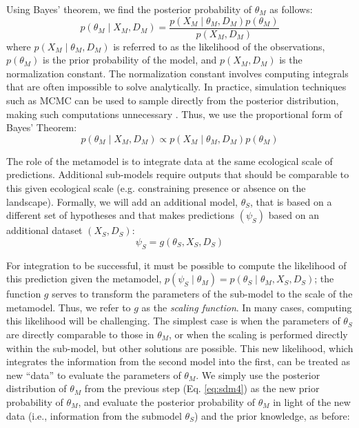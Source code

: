 \documentclass[11pt]{article}
\begin{document}
Using Bayes' theorem, we find the posterior probability of \(\theta_M\) as follows:
\begin{equation}
\label{eq:sdm3}
	p( \theta_M \mid X_M, D_M ) = \frac{ p( X_M \mid \theta_M, D_M ) p( \theta_M ) } { p(X_M, D_M) }
\end{equation}
where \(p( X_M \mid \theta_M, D_M )\) is referred to as the likelihood of the observations, \(p(\theta_M )\) is the prior probability of the model, and \(p(X_M, D_M)\) is the normalization constant.
The normalization constant involves computing integrals that are often impossible to solve analytically. 
In practice, simulation techniques such as MCMC can be used to sample directly from the posterior distribution, making such computations unnecessary \citep{Link2006}.
Thus, we use the proportional form of Bayes' Theorem:
\begin{equation}
\label{eq:sdm4}
	p( \theta_M \mid X_M, D_M ) \propto p( X_M \mid \theta_M, D_M ) p( \theta_M ) 
\end{equation}

The role of the metamodel is to integrate data at the same ecological scale of predictions.
Additional sub-models require outputs that should be comparable to this given ecological scale (e.g. constraining presence or absence on the landscape).
Formally, we will add an additional model, \(\theta_S\), that is based on a different set of hypotheses and that makes predictions \((\psi_S)\) based on an additional dataset \((X_S, D_S)\):
\begin{equation}
\label{eq:model2-1}
	\psi_S = g(\theta_S, X_S, D_S)
\end{equation}

For integration to be successful, it must be possible to compute the likelihood of this prediction given the metamodel, \(p \left( \psi_S \mid \theta_M \right) = p \left(\theta_S \mid \theta_M, X_S, D_S \right)\); the function \(g\) serves to transform the parameters of the sub-model to the scale of the metamodel. Thus, we refer to \(g\) as the \emph{scaling function}. 
In many cases, computing this likelihood will be challenging.
The simplest case is when the parameters of \(\theta_S\) are directly comparable to those in \(\theta_M\), or when the scaling is performed directly within the sub-model, but other solutions are possible.
This new likelihood, which integrates the information from the second model into the first, can be treated as new ``data'' to evaluate the parameters of \(\theta_M\).
We simply use the posterior distribution of \(\theta_M\) from the previous step (Eq. \ref{eq:sdm4}) as the new prior probability of \(\theta_M\), and evaluate the posterior probability of \(\theta_M\) in light of the new data (i.e., information from the submodel \(\theta_S\)) and the prior knowledge, as before:
\end{document}
